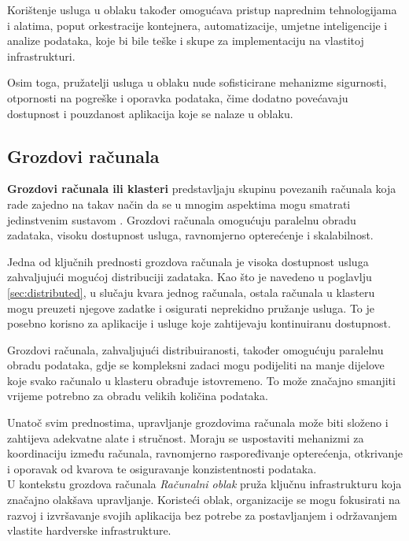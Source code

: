\documentclass[times, utf8, diplomski]{fer}
\begin{document}
Korištenje usluga u oblaku također omogućava pristup naprednim tehnologijama i alatima, poput orkestracije kontejnera, automatizacije, umjetne inteligencije i analize podataka, koje bi bile teške i skupe za implementaciju na vlastitoj infrastrukturi.

Osim toga, pružatelji usluga u oblaku nude sofisticirane mehanizme sigurnosti, otpornosti na pogreške i oporavka podataka, čime dodatno povećavaju dostupnost i pouzdanost aplikacija koje se nalaze u oblaku.

\subsection{Grozdovi računala}

\textbf{Grozdovi računala ili klasteri}  predstavljaju skupinu povezanih računala koja rade zajedno na takav način da se u mnogim aspektima mogu smatrati jedinstvenim sustavom \citep{zarko_raspodijeljeni_2013}. Grozdovi računala omogućuju paralelnu obradu zadataka, visoku dostupnost usluga, ravnomjerno opterećenje i skalabilnost.

Jedna od ključnih prednosti grozdova računala je visoka dostupnost usluga zahvaljujući mogućoj distribuciji zadataka. Kao što je navedeno u poglavlju \ref{sec:distributed}, u slučaju kvara jednog računala, ostala računala u klasteru mogu preuzeti njegove zadatke i osigurati neprekidno pružanje usluga. To je posebno korisno za aplikacije i usluge koje zahtijevaju kontinuiranu dostupnost.

Grozdovi računala, zahvaljujući distribuiranosti, također omogućuju paralelnu obradu podataka, gdje se kompleksni zadaci mogu podijeliti na manje dijelove koje svako računalo u klasteru obrađuje istovremeno. To može značajno smanjiti vrijeme potrebno za obradu velikih količina podataka.

Unatoč svim prednostima, upravljanje grozdovima računala može biti složeno i zahtijeva adekvatne alate i stručnost. Moraju se uspostaviti mehanizmi za koordinaciju između računala, ravnomjerno raspoređivanje opterećenja, otkrivanje i oporavak od kvarova te osiguravanje konzistentnosti podataka. \\

U kontekstu grozdova računala \emph{Računalni oblak}  pruža ključnu infrastrukturu koja značajno olakšava upravljanje. Koristeći oblak, organizacije se mogu fokusirati na razvoj i izvršavanje svojih aplikacija bez potrebe za postavljanjem i održavanjem vlastite hardverske infrastrukture.
\end{document}
